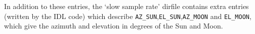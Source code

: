 \documentclass[a4paper,10pt]{article}
\begin{document}



In addition to these entries, the `slow sample rate' dirfile contains
extra entries (written by the IDL code) which describe
\texttt{AZ\_SUN},\texttt{EL\_SUN},\texttt{AZ\_MOON} and
\texttt{EL\_MOON}, which give the azimuth and elevation in degrees of
the Sun and Moon.




\end{document}
